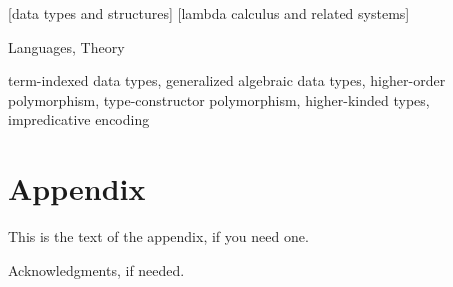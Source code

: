 \documentclass[preprint]{sigplanconf}
\theoremstyle{plain}
\theoremstyle{remark}
\theoremstyle{definition}
\begin{document}
[data types and structures]
[lambda calculus and related systems]

\terms
Languages, Theory

\keywords
term-indexed data types, generalized algebraic data types,
higher-order polymorphism, type-constructor polymorphism, higher-kinded types,
impredicative encoding











\appendix

\section{Appendix}

This is the text of the appendix, if you need one.

\acks

Acknowledgments, if needed.







\end{document}
